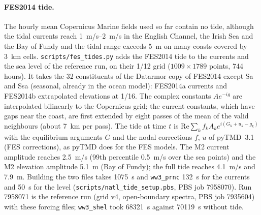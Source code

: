 \documentclass[11pt,a4paper]{article}
\begin{document}
\paragraph{FES2014 tide.}\label{sec:tide} The hourly mean Copernicus
Marine fields used so far contain no tide, although the tidal currents reach \SIrange{1}{2}{m/s} in
the English Channel, the Irish Sea and the Bay of Fundy and the tidal range
exceeds \SI{5}{m} on many coasts covered by \SI{3}{km} cells.
\texttt{scripts/fes\_tides.py} adds the FES2014 tide to the currents and
the sea level of the reference run, on their 1/12\textdegree{} grid
($1009\times1789$ points, 744 hours). It takes the 32 constituents of the
Datarmor copy of FES2014 except Sa and Ssa (seasonal, already in the ocean
model): FES2014a currents and FES2014b extrapolated elevations at
1/16\textdegree. The complex constants $A e^{-ig}$ are interpolated
bilinearly to the Copernicus grid; the current constants, which have gaps
near the coast, are first extended by eight passes of the mean of the valid
neighbours (about \SI{7}{km} per pass). The tide at time $t$ is
$\mathrm{Re}\sum_k f_k A_k e^{i(G_k+u_k-g_k)}$ with the equilibrium
arguments $G$ and the nodal corrections $f$, $u$ of pyTMD~3.1 (FES
corrections), as pyTMD does for the FES models. The M2 current amplitude
reaches \SI{2.5}{m/s} (99th percentile \SI{0.5}{m/s} over the sea points)
and the M2 elevation amplitude \SI{5.1}{m} (Bay of Fundy); the full tide
reaches \SI{4.1}{m/s} and \SI{7.9}{m}. Building the two files takes
\SI{1075}{s} and \texttt{ww3\_prnc} \SI{132}{s} for the currents and
\SI{50}{s} for the level (\texttt{scripts/natl\_tide\_setup.pbs}, PBS job
7958070). Run 7958071 is the reference run (grid v4, open-boundary
spectra, PBS job 7935604) with these forcing files; \texttt{ww3\_shel} took
\SI{68321}{s} against \SI{70119}{s} without tide.
\end{document}
